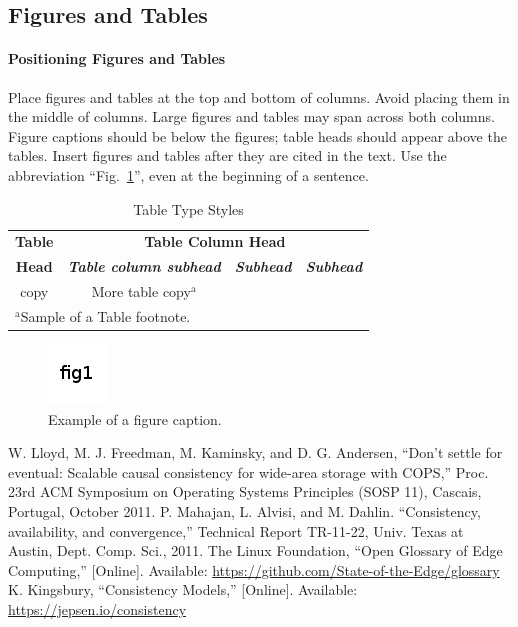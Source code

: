 \documentclass[conference]{IEEEtran}
\begin{document}
\subsection{Figures and Tables}
\paragraph{Positioning Figures and Tables} Place figures and tables at the top and
bottom of columns. Avoid placing them in the middle of columns. Large
figures and tables may span across both columns. Figure captions should be
below the figures; table heads should appear above the tables. Insert
figures and tables after they are cited in the text. Use the abbreviation
``Fig.~\ref{fig}'', even at the beginning of a sentence.

\begin{table}[htbp]
\caption{Table Type Styles}
\begin{center}
\begin{tabular}{|c|c|c|c|}
\hline
\textbf{Table}&\multicolumn{3}{|c|}{\textbf{Table Column Head}} \\
\cline{2-4}
\textbf{Head} & \textbf{\textit{Table column subhead}}& \textbf{\textit{Subhead}}& \textbf{\textit{Subhead}} \\
\hline
copy& More table copy$^{\mathrm{a}}$& &  \\
\hline
\multicolumn{4}{l}{$^{\mathrm{a}}$Sample of a Table footnote.}
\end{tabular}
\label{tab1}
\end{center}
\end{table}

\begin{figure}[htbp]
\centerline{\includegraphics[scale=0.5]{fig1.png}}
\caption{Example of a figure caption.}
\label{fig}
\end{figure}

\begin{thebibliography}{00}
 W. Lloyd, M. J. Freedman, M. Kaminsky, and D. G. Andersen, ``Don’t settle for eventual: Scalable causal consistency for wide-area storage with COPS,'' Proc. 23rd ACM Symposium on Operating Systems Principles (SOSP 11), Cascais, Portugal, October 2011.
 P. Mahajan, L. Alvisi, and M. Dahlin. ``Consistency, availability, and convergence,'' Technical Report TR-11-22, Univ. Texas at Austin, Dept. Comp. Sci., 2011.
 The Linux Foundation, ``Open Glossary of Edge Computing,'' [Online]. Available: \url{https://github.com/State-of-the-Edge/glossary}
 K. Kingsbury, ``Consistency Models,'' [Online]. Available: \url{https://jepsen.io/consistency}
\end{thebibliography}
\end{document}
